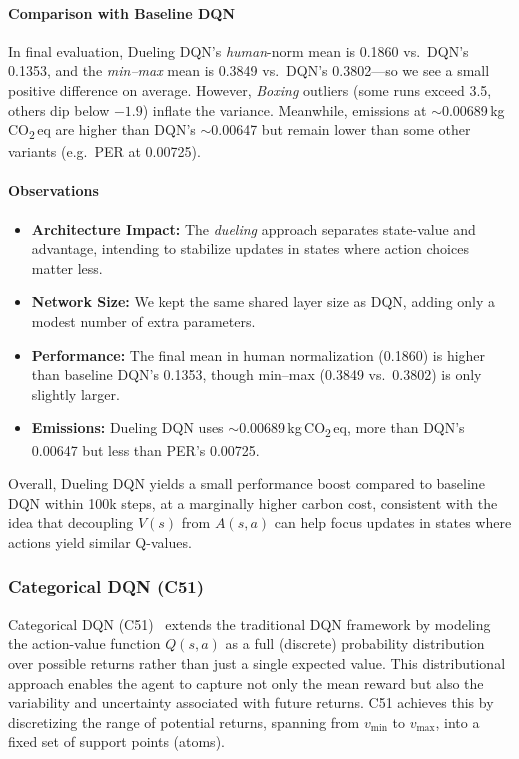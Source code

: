 \paragraph{Comparison with Baseline DQN}
In final evaluation, Dueling DQN's \emph{human}-norm mean is \num{0.1860} vs.\ DQN's \num{0.1353}, 
and the \emph{min--max} mean is \num{0.3849} vs.\ DQN's \num{0.3802}—so we see a small positive difference on average.
However, \emph{Boxing} outliers (some runs exceed 3.5, others dip below $-1.9$) inflate the variance.
Meanwhile, emissions at $\sim$\num{0.00689}\,kg\,CO\textsubscript{2}\,eq are higher than DQN's $\sim$\num{0.00647} but remain
lower than some other variants (e.g.\ PER at \num{0.00725}).

\paragraph{Observations}
\begin{itemize}
	\item \textbf{Architecture Impact:}
	The \emph{dueling} approach separates state-value and advantage,
	intending to stabilize updates in states where action choices matter less.
	\item \textbf{Network Size:}
	We kept the same shared layer size as DQN, adding only a modest number of extra parameters.
	\item \textbf{Performance:}
	The final mean in human normalization (0.1860) is higher than baseline DQN's 0.1353,
	though min--max (0.3849 vs.\ 0.3802) is only slightly larger.
	\item \textbf{Emissions:}
	Dueling DQN uses $\sim$\num{0.00689}\,kg\,CO\textsubscript{2}\,eq,
	more than DQN's 0.00647 but less than PER's 0.00725.
\end{itemize}

Overall, Dueling DQN yields a small performance boost compared to baseline DQN 
within 100k steps, at a marginally higher carbon cost, consistent with the idea 
that decoupling $V(s)$ from $A(s,a)$ can help focus updates in states 
where actions yield similar Q-values.

\subsubsection{Categorical DQN (C51)}
\label{subsubsec:c51}
Categorical DQN (C51)~\cite{bellemare:distributional} extends the traditional DQN framework by modeling the action-value function $Q(s,a)$ as a full (discrete) probability distribution over possible returns rather than just a single expected value. This distributional approach enables the agent to capture not only the mean reward but also the variability and uncertainty associated with future returns. C51 achieves this by discretizing the range of potential returns, spanning from $v_{\mathrm{min}}$ to $v_{\mathrm{max}}$, into a fixed set of support points (atoms).

